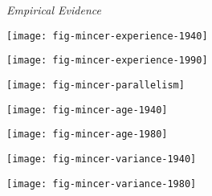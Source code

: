 \begin{frame}\begin{center}
\LARGE\textit{Empirical Evidence}
\end{center}\end{frame}

\begin{frame}[plain]
\begin{center}
\texttt{[image: fig-mincer-experience-1940]}
\end{center}
\end{frame}

\begin{frame}[plain]
\begin{center}
\texttt{[image: fig-mincer-experience-1990]}
\end{center}
\end{frame}

\begin{frame}[plain]
\begin{center}
\texttt{[image: fig-mincer-parallelism]}
\end{center}
\end{frame}

\begin{frame}[plain]
\begin{center}
\texttt{[image: fig-mincer-age-1940]}
\end{center}
\end{frame}

\begin{frame}[plain]
\begin{center}
\texttt{[image: fig-mincer-age-1980]}
\end{center}
\end{frame}

\begin{frame}[plain]
\begin{center}
\texttt{[image: fig-mincer-variance-1940]}
\end{center}
\end{frame}

\begin{frame}[plain]
\begin{center}
\texttt{[image: fig-mincer-variance-1980]}
\end{center}
\end{frame}


